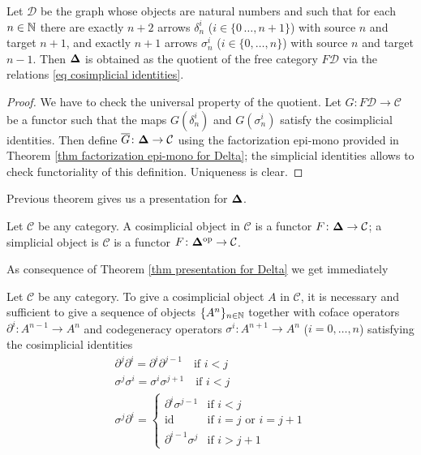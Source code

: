 \begin{thm} \label{thm presentation for Delta}
Let $\mathcal D$ be the graph whose objects are natural numbers and such that for each $n \in \mathbb{N}$ there are exactly $n+2$ arrows $\delta^i_n$ ($i \in \{0\,\ldots,n+1\}$) with source $n$ and target $n+1$, and exactly $n+1$ arrows $\sigma^i_n$ ($i \in \{0,\ldots,n\}$) with source $n$ and target $n-1$. Then $\mathbf \Delta$ is obtained as the quotient of the free category $F \mathcal D$ via the relations \eqref{eq cosimplicial identities}.
\end{thm}

\begin{proof}
We have to check the universal property of the quotient. Let $G \colon F \mathcal D \to \mathcal C$ be a functor such that the maps $G(\delta^i_n)$ and $G(\sigma^i_n)$ satisfy the cosimplicial identities. Then define $\overline{G} \colon \mathbf \Delta \to \mathcal C$ using the factorization epi-mono provided in Theorem \ref{thm factorization epi-mono for Delta}; the simplicial identities allows to check functoriality of this definition. Uniqueness is clear.
\end{proof}

\begin{rmk}
Previous theorem gives us a presentation for $\mathbf \Delta$.
\end{rmk}

\begin{defin} \label{def (co)simplicial objects}
Let $\mathcal C$ be any category. A cosimplicial object in $\mathcal C$ is a functor $F \colon \mathbf \Delta \to \mathcal C$; a simplicial object is $\mathcal C$ is a functor $F \colon \mathbf \Delta^\text{op} \to \mathcal C$.
\end{defin}

As consequence of Theorem \ref{thm presentation for Delta} we get immediately

\begin{cor}
Let $\mathcal C$ be any category. To give a cosimplicial object $A$ in $\mathcal C$, it is necessary and sufficient to give a sequence of objects $\{A^n\}_{n \in \mathbb{N}}$ together with coface operators $\partial^i \colon A^{n-1} \to A^n$ and codegeneracy operators $\sigma^i \colon A^{n+1} \to A^n$ ($i = 0,\ldots,n$) satisfying the cosimplicial identities
\begin{gather*}
\partial^j \partial^i = \partial^i \partial^{j-1} \quad \text{if } i < j \\
\sigma^j \sigma^i = \sigma^i \sigma^{j+1} \quad \text{if } i < j \\
\sigma^j \partial^i = \begin{cases}
\partial^i \sigma^{j-1} & \text{if } i < j \\
\mathrm{id} & \text{if } i = j \text{ or } i = j+1 \\
\partial^{i-1} \sigma^j & \text{if } i > j+1
\end{cases}
\end{gather*}
\end{cor}

